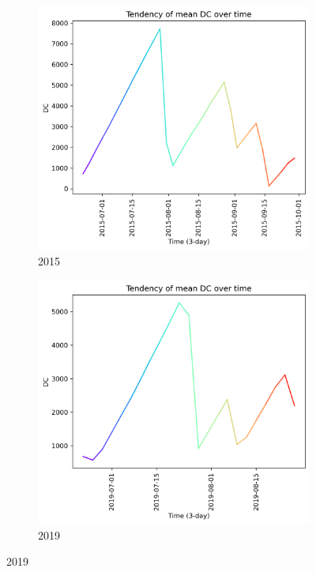 \begin{figure}[h]
	\caption{DC mean tendency graph}
	\centering
	\begin{subfigure}{0.49\textwidth}
		\centering
		\includegraphics[width=\textwidth]{graphs/all_time/2015_tendency_graph_DC.png}
		\caption{2015}
		\label{fig:mean_tendency_dc_2015}
	\end{subfigure}
	\hfill
	\begin{subfigure}{0.49\textwidth}
		\centering
		\includegraphics[width=\textwidth]{graphs/all_time/2019_tendency_graph_DC.png}
		\caption{2019}
		\label{fig:mean_tendency_dc_2019}
	\end{subfigure}
	\label{fig:mean_tendency_dc}
\end{figure}

